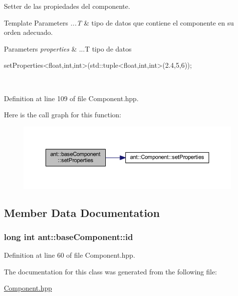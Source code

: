 Setter de las propiedades del componente. 


\begin{DoxyTemplParams}{Template Parameters}
{\em ...\+T} & tipo de datos que contiene el componente en su orden adecuado. \\
\hline
\end{DoxyTemplParams}

\begin{DoxyParams}{Parameters}
{\em properties} & ...T tipo de datos 
\begin{DoxyCode}
setProperties<float,int,int>(std::tuple<float,int,int>(2.4,5,6));
\end{DoxyCode}
 \\
\hline
\end{DoxyParams}


Definition at line 109 of file Component.\+hpp.



Here is the call graph for this function\+:
\nopagebreak
\begin{figure}[H]
\begin{center}
\leavevmode
\includegraphics[width=350pt]{d4/dd4/classant_1_1base_component_a85aa249d86676f21407ddc7ef321c6c4_cgraph}
\end{center}
\end{figure}




\subsection{Member Data Documentation}
\hypertarget{classant_1_1base_component_a27d4ac318ff9a3aa9e7be2391dbb85be}{
\subsubsection[{id}]{\setlength{\rightskip}{0pt plus 5cm}long int ant\+::base\+Component\+::id\hspace{0.3cm}{\ttfamily [private]}}}\label{classant_1_1base_component_a27d4ac318ff9a3aa9e7be2391dbb85be}


Definition at line 60 of file Component.\+hpp.



The documentation for this class was generated from the following file\+:\begin{DoxyCompactItemize}
\item 
\hyperlink{_component_8hpp}{Component.\+hpp}\end{DoxyCompactItemize}

